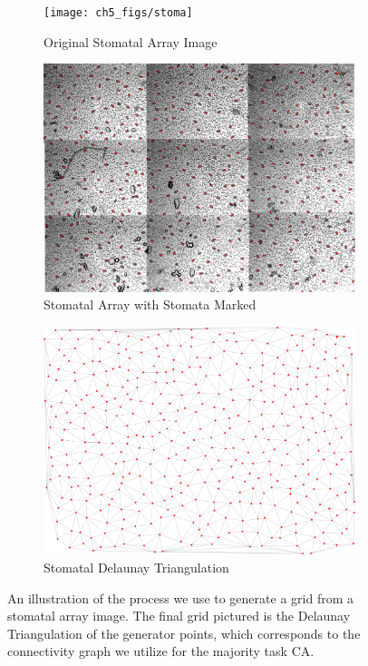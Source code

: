 \documentclass[a4paper,11pt]{article}
\begin{document}
\begin{figure}[htp]
\centering
  \begin{subfigure}[t]{0.6\textwidth}
  \texttt{[image: ch5\_figs/stoma]}
  \caption{Original Stomatal Array Image}
  \end{subfigure}

  \begin{subfigure}[t]{0.6\textwidth}
  \centering
  \includegraphics[width=\textwidth]{ch5_figs/stoma-colored}
  \caption{Stomatal Array with Stomata Marked}
  \end{subfigure}

  \begin{subfigure}[t]{0.6\textwidth}
  \centering
  \includegraphics[width=\textwidth]{ch5_figs/stoma_red_edited}
  \caption{Stomatal Delaunay Triangulation}
  \end{subfigure}
\caption[Grid Generation from Stomatal Array]{
  An illustration of the process we use to generate a grid from a stomatal array image. The final grid pictured is the Delaunay Triangulation of the generator points, which corresponds to the connectivity graph we utilize for the majority task CA.
  }
\label{fig:stoma_graph_gen}
\end{figure}
\end{document}
